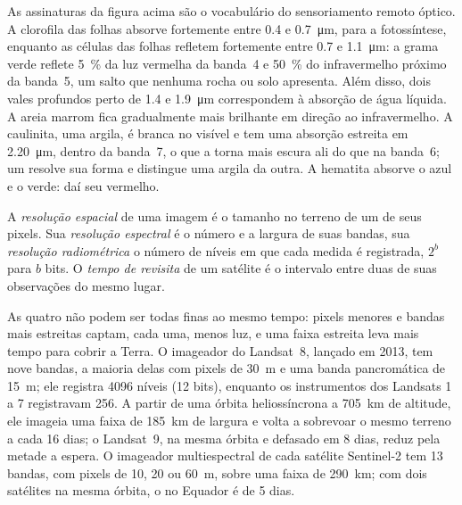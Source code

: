 As assinaturas da figura acima são o vocabulário do sensoriamento
remoto óptico. A clorofila das folhas absorve fortemente entre 0.4 e
\qty{0.7}{\micro\metre}, para a fotossíntese, enquanto as células das folhas
refletem fortemente entre 0.7 e \qty{1.1}{\micro\metre}: a grama verde reflete \qty{5}{\percent} da luz
vermelha da banda~4 e \qty{50}{\percent}
do infravermelho próximo da banda~5, um salto que nenhuma rocha ou solo apresenta. Além disso, dois
vales profundos perto de 1.4 e \qty{1.9}{\micro\metre} correspondem à
absorção de água líquida. A areia marrom fica gradualmente mais brilhante em direção ao infravermelho. A caulinita,
uma argila, é branca no visível e tem uma absorção estreita em
\qty{2.20}{\micro\metre}, dentro da banda~7, o que a torna mais escura ali do que
na banda~6; um  resolve sua forma e distingue uma argila
da outra. A hematita absorve o azul e o verde: daí seu vermelho.

\begin{definition}\label{def:b3:remote-sensing-gis:resolutions}
A \emph{resolução espacial} de uma imagem é o
tamanho no terreno de um de seus pixels. Sua \emph{resolução
espectral} é o número e a largura de suas
bandas, sua \emph{resolução radiométrica} o
número de níveis em que cada medida é registrada, $2^b$ para $b$ bits.
O \emph{tempo de revisita} de um satélite é o intervalo
entre duas de suas observações do mesmo lugar.
\end{definition}

As quatro não podem ser todas finas ao mesmo tempo: pixels menores e bandas
mais estreitas captam, cada uma, menos luz, e uma faixa estreita leva mais
tempo para cobrir a Terra. O imageador do Landsat~8, lançado em 2013, tem nove bandas, a maioria
delas com pixels de \qty{30}{m} e uma banda pancromática de \qty{15}{m}; ele
registra 4096 níveis (12 bits), enquanto os instrumentos dos Landsats 1 a 7
registravam 256. A partir de uma órbita heliossíncrona a \qty{705}{km} de altitude, ele imageia uma
faixa de \qty{185}{km} de largura e volta a sobrevoar o mesmo terreno a cada 16 dias;
o Landsat~9, na mesma órbita e defasado em 8 dias, reduz pela metade a espera. O
imageador multiespectral de cada satélite Sentinel-2 tem 13 bandas, com pixels de 10, 20
ou \qty{60}{m}, sobre uma faixa de \qty{290}{km}; com dois satélites na
mesma órbita, o  no Equador é de 5 dias.

